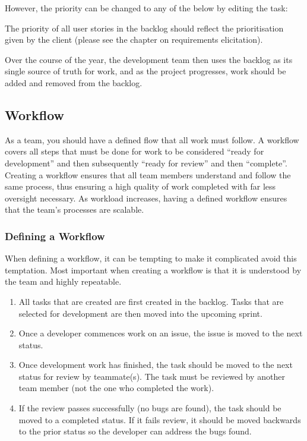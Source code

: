\documentclass[letterpaper,10pt,english]{jupyterBook}
\begin{document}
\sphinxAtStartPar
{}

\sphinxAtStartPar
However, the priority can be changed to any of the below by editing the
task:

\sphinxAtStartPar
{}

\sphinxAtStartPar
The priority of all user stories in the backlog should reflect the
prioritisation given by the client (please see the chapter on
requirements elicitation).

\sphinxAtStartPar
Over the course of the year, the development team then uses the backlog
as its single source of truth for work, and as the project progresses,
work should be added and removed from the backlog.


\subsection{Workflow}
\label{\detokenize{chapter_3/task_tracking:workflow}}
\sphinxAtStartPar
As a team, you should have a defined flow that all work must follow. A
workflow covers all steps that must be done for work to be considered
“ready for development” and then subsequently “ready for review” and
then “complete”. Creating a workflow ensures that all team members
understand and follow the same process, thus ensuring a high quality of
work completed with far less oversight necessary. As workload increases,
having a defined workflow ensures that the team’s processes are
scalable.


\subsubsection{Defining a Workflow}
\label{\detokenize{chapter_3/task_tracking:defining-a-workflow}}
\sphinxAtStartPar
When defining a workflow, it can be tempting to make it complicated \sphinxhyphen{}
avoid this temptation. Most important when creating a workflow is that
it is understood by the team and highly repeatable.
\begin{enumerate}
%
\item {} 
\sphinxAtStartPar
All tasks that are created are first created in the backlog. Tasks
that are selected for development are then moved into the upcoming
sprint.

\item {} 
\sphinxAtStartPar
Once a developer commences work on an issue, the issue is moved to
the next status.

\item {} 
\sphinxAtStartPar
Once development work has finished, the task should be moved to the
next status for review by teammate(s). The task must be reviewed by
another team member (not the one who completed the work).

\item {} 
\sphinxAtStartPar
If the review passes successfully (no bugs are found), the task
should be moved to a completed status. If it fails review, it should
be moved backwards to the prior status so the developer can address
the bugs found.

\end{enumerate}
\end{document}
